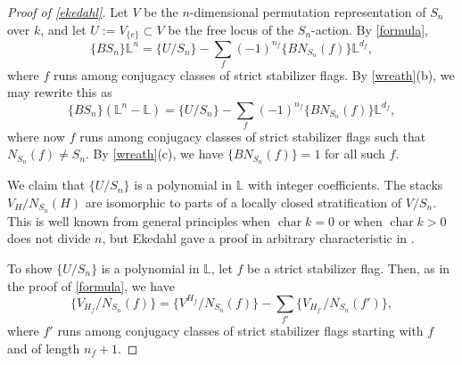 \documentclass[12 pt]{amsart}
\theoremstyle{plain}
\theoremstyle{definition}
\theoremstyle{remark}
\numberwithin{equation}{section}
\newcommand\bl{\mathbb L}
\renewcommand{\L}{\mathbb L}
\newcommand{\on}[1]{\operatorname{#1}}
\begin{document}
\begin{proof}[Proof of \autoref{ekedahl}]
Let $V$ be the $n$-dimensional permutation representation of $S_n$ over $k$, and let
$U:=V_{\{e\}}\subset V$ be the free locus of the $S_n$-action. By
\autoref{formula}, 
\[\{BS_n\}\L^n=\{U/S_n\}-\sum_f(-1)^{n_f}\{BN_{S_n}(f)\}\L^{d_f},\]
where $f$ runs among conjugacy classes of strict stabilizer flags. By \autoref{wreath}(b), we may rewrite this as
\[\{BS_n\}(\L^n-\L)=\{U/S_n\}-\sum_f(-1)^{n_f}\{BN_{S_n}(f)\}\L^{d_f},\]	
where now $f$ runs among conjugacy classes of strict stabilizer flags such that $N_{S_n}(f)\neq S_n$.	By \autoref{wreath}(c), we have $\{BN_{S_n}(f)\}=1$ for all such $f$.


We claim that $\{U/S_n\}$ is a polynomial in $\L$ with integer coefficients. The
stacks
$V_H/N_{S_n}(H)$ are isomorphic to parts of a locally closed stratification of $V/S_n$. This is well known from general principles when $\on{char}k=0$ or when $\on{char}k>0$ does not divide $n$, but Ekedahl gave a proof in arbitrary characteristic in \cite[Prop.\ 1.1(ii)]{ekedahlGeometricInvariantFinite2009}.

To show $\{U/S_n\}$ is a polynomial in $\bl$, let $f$ be a strict stabilizer flag. Then, as in the proof of \autoref{formula}, we have
\[\{V_{H_f}/N_{S_n}(f)\}=\{V^{H_f}/N_{S_n}(f)\}-\sum_{f'}\{V_{H_{f'}}/N_{S_n}(f')\},\]
where $f'$ runs among conjugacy classes of strict stabilizer flags starting with $f$ and of length $n_f+1$.


\end{proof}
\end{document}

